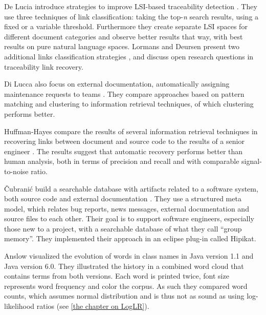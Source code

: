 De Lucia \etal introduce strategies to improve LSI-based traceability detection \cite{Luci04a}. They use three techniques of link classification: taking the top-\emph{n} search results, using a fixed or a variable threshold. Furthermore they create separate LSI spaces for different document categories and observe better results that way, with best results on pure natural language spaces. Lormans and Deursen present two additional links classification strategies \cite{Lorm06a}, and discuss open research questions in traceability link recovery.

Di Lucca \etal also focus on external documentation, automatically assigning maintenance requests to teams \cite{Lucc02b}. They compare approaches based on pattern matching and clustering to information retrieval techniques, of which clustering performs better.

Huffman-Hayes \etal compare the results of several information retrieval techniques in recovering links between document and source code to the results of a senior engineer \cite{Huff06a}. The results suggest that automatic recovery performs better than human analysis, both in terms of precision and recall and with comparable signal-to-noise ratio.

\v{C}ubrani\'{c} \etal build a searchable database with artifacts related to a software system, both source code and external documentation \cite{Cubr03a}. They use a structured meta model, which relates bug reports, news messages, external documentation and source files to each other. Their goal is to support software engineers, especially those new to a project, with a searchable database of what they call ``group memory''. They implemented their approach in an eclipse plug-in called Hipikat.


Anslow \etal \cite{Anslow08OOPSLA} visualized the evolution of words in class names in Java version 1.1 and Java version 6.0. They illustrated the history in a combined word cloud that contains terms from both versions. Each word is printed twice, font size represents word frequency and color the corpus. As such they compared word counts, which assumes normal distribution and is thus not as sound as using log-likelihood ratios (see \autoref{the chapter on LogLR}).
 
